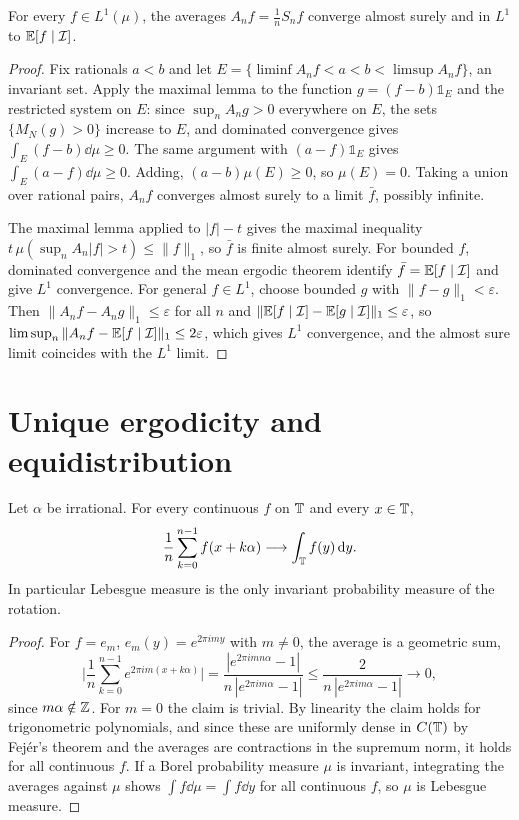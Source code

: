 \begin{theorem}
\label{thm:birkhoff}
For every $f\in L^1(\mu)$, the averages $A_nf = \frac1nS_nf$ converge almost surely and in $L^1$ to $\mathbb{E}[f\mid\mathcal{I}]$.
\end{theorem}

\begin{proof}
Fix rationals $a<b$ and let $E = \{\liminf A_nf<a<b<\limsup A_nf\}$, an invariant set. Apply the maximal lemma to the function $g = (f-b)\mathbb{1}_E$ and the restricted system on $E$: since $\sup_nA_ng>0$ everywhere on $E$, the sets $\{M_N(g)>0\}$ increase to $E$, and dominated convergence gives $\int_E(f-b)\dd\mu\geq0$. The same argument with $(a-f)\mathbb{1}_E$ gives $\int_E(a-f)\dd\mu\geq0$. Adding, $(a-b)\mu(E)\geq0$, so $\mu(E) = 0$. Taking a union over rational pairs, $A_nf$ converges almost surely to a limit $\bar f$, possibly infinite.

The maximal lemma applied to $|f|-t$ gives the maximal inequality $t\,\mu(\sup_nA_n|f|>t)\leq\|f\|_1$, so $\bar f$ is finite almost surely. For bounded $f$, dominated convergence and the mean ergodic theorem identify $\bar f = \mathbb{E}[f\mid\mathcal{I}]$ and give $L^1$ convergence. For general $f\in L^1$, choose bounded $g$ with $\|f-g\|_1<\varepsilon$. Then $\|A_nf-A_ng\|_1\leq\varepsilon$ for all $n$ and $\|\mathbb{E}[f\mid\mathcal{I}]-\mathbb{E}[g\mid\mathcal{I}]\|_1\leq\varepsilon$, so $\limsup_n\|A_nf-\mathbb{E}[f\mid\mathcal{I}]\|_1\leq2\varepsilon$, which gives $L^1$ convergence, and the almost sure limit coincides with the $L^1$ limit.
\end{proof}

\section{Unique ergodicity and equidistribution}

\begin{theorem}
\label{thm:weyl_equidistribution}
Let $\alpha$ be irrational. For every continuous $f$ on $\mathbb{T}$ and every $x\in\mathbb{T}$,
\[
\frac1n\sum_{k=0}^{n-1}f(x+k\alpha)\longrightarrow\int_{\mathbb{T}} f(y)\,\mathrm{d} y.
\]
In particular Lebesgue measure is the only invariant probability measure of the rotation.
\end{theorem}

\begin{proof}
For $f = e_m$, $e_m(y) = e^{2\pi imy}$ with $m\neq0$, the average is a geometric sum,
\[
\Big|\frac1n\sum_{k=0}^{n-1}e^{2\pi im(x+k\alpha)}\Big| = \frac{|e^{2\pi imn\alpha}-1|}{n\,|e^{2\pi im\alpha}-1|}\leq\frac{2}{n\,|e^{2\pi im\alpha}-1|}\to0,
\]
since $m\alpha\notin\mathbb{Z}$. For $m = 0$ the claim is trivial. By linearity the claim holds for trigonometric polynomials, and since these are uniformly dense in $C(\mathbb{T})$ by Fej\'er's theorem and the averages are contractions in the supremum norm, it holds for all continuous $f$. If a Borel probability measure $\mu$ is invariant, integrating the averages against $\mu$ shows $\int f\dd\mu = \int f\dd y$ for all continuous $f$, so $\mu$ is Lebesgue measure.
\end{proof}

